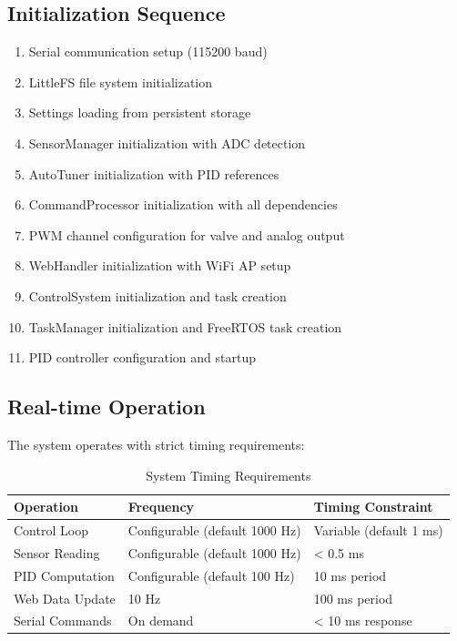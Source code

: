 \documentclass[12pt,a4paper]{article}
\begin{document}
\subsection{Initialization Sequence}
\begin{enumerate}
    \item Serial communication setup (115200 baud)
    \item LittleFS file system initialization
    \item Settings loading from persistent storage
    \item SensorManager initialization with ADC detection
    \item AutoTuner initialization with PID references
    \item CommandProcessor initialization with all dependencies
    \item PWM channel configuration for valve and analog output
    \item WebHandler initialization with WiFi AP setup
    \item ControlSystem initialization and task creation
    \item TaskManager initialization and FreeRTOS task creation
    \item PID controller configuration and startup
\end{enumerate}

\subsection{Real-time Operation}
The system operates with strict timing requirements:

\begin{table}[H]
\centering
\begin{tabular}{@{}lll@{}}
\toprule
\textbf{Operation} & \textbf{Frequency} & \textbf{Timing Constraint} \\
\midrule
Control Loop & Configurable (default 1000 Hz) & Variable (default 1 ms) \\
Sensor Reading & Configurable (default 1000 Hz) & < 0.5 ms \\
PID Computation & Configurable (default 100 Hz) & 10 ms period \\
Web Data Update & 10 Hz & 100 ms period \\
Serial Commands & On demand & < 10 ms response \\
\bottomrule
\end{tabular}
\caption{System Timing Requirements}
\end{table}
\end{document}

